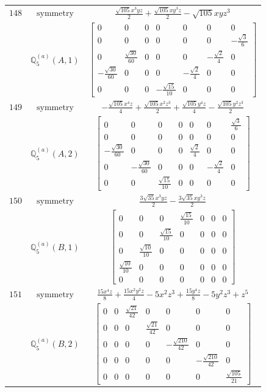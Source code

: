 \documentclass[fleqn,8pt,landscape]{jsarticle}
\begin{document}
\begin{longtable}{ccc}
$ 148 $ & $ \text{symmetry} $ & $ \frac{\sqrt{105} x^{3} y z}{2} + \frac{\sqrt{105} x y^{3} z}{2} - \sqrt{105} x y z^{3} $ \\
$  $ & $ \mathbb{Q}_{5}^{(a)}(A,1) $ & $ \begin{bmatrix} 0 & 0 & 0 & 0 & 0 & 0 & 0 \\ 0 & 0 & 0 & 0 & 0 & 0 & - \frac{\sqrt{3}}{6} \\ 0 & \frac{\sqrt{30}}{60} & 0 & 0 & 0 & - \frac{\sqrt{2}}{4} & 0 \\ - \frac{\sqrt{30}}{60} & 0 & 0 & 0 & - \frac{\sqrt{2}}{4} & 0 & 0 \\ 0 & 0 & 0 & - \frac{\sqrt{15}}{10} & 0 & 0 & 0 \end{bmatrix} $ \\ \hline
$ 149 $ & $ \text{symmetry} $ & $ - \frac{\sqrt{105} x^{4} z}{4} + \frac{\sqrt{105} x^{2} z^{3}}{2} + \frac{\sqrt{105} y^{4} z}{4} - \frac{\sqrt{105} y^{2} z^{3}}{2} $ \\
$  $ & $ \mathbb{Q}_{5}^{(a)}(A,2) $ & $ \begin{bmatrix} 0 & 0 & 0 & 0 & 0 & 0 & \frac{\sqrt{3}}{6} \\ 0 & 0 & 0 & 0 & 0 & 0 & 0 \\ - \frac{\sqrt{30}}{60} & 0 & 0 & 0 & \frac{\sqrt{2}}{4} & 0 & 0 \\ 0 & - \frac{\sqrt{30}}{60} & 0 & 0 & 0 & - \frac{\sqrt{2}}{4} & 0 \\ 0 & 0 & \frac{\sqrt{15}}{10} & 0 & 0 & 0 & 0 \end{bmatrix} $ \\ \hline
$ 150 $ & $ \text{symmetry} $ & $ \frac{3 \sqrt{35} x^{3} y z}{2} - \frac{3 \sqrt{35} x y^{3} z}{2} $ \\
$  $ & $ \mathbb{Q}_{5}^{(a)}(B,1) $ & $ \begin{bmatrix} 0 & 0 & 0 & \frac{\sqrt{15}}{10} & 0 & 0 & 0 \\ 0 & 0 & \frac{\sqrt{15}}{10} & 0 & 0 & 0 & 0 \\ 0 & \frac{\sqrt{10}}{10} & 0 & 0 & 0 & 0 & 0 \\ \frac{\sqrt{10}}{10} & 0 & 0 & 0 & 0 & 0 & 0 \\ 0 & 0 & 0 & 0 & 0 & 0 & 0 \end{bmatrix} $ \\ \hline
$ 151 $ & $ \text{symmetry} $ & $ \frac{15 x^{4} z}{8} + \frac{15 x^{2} y^{2} z}{4} - 5 x^{2} z^{3} + \frac{15 y^{4} z}{8} - 5 y^{2} z^{3} + z^{5} $ \\
$  $ & $ \mathbb{Q}_{5}^{(a)}(B,2) $ & $ \begin{bmatrix} 0 & 0 & \frac{\sqrt{21}}{42} & 0 & 0 & 0 & 0 \\ 0 & 0 & 0 & \frac{\sqrt{21}}{42} & 0 & 0 & 0 \\ 0 & 0 & 0 & 0 & - \frac{\sqrt{210}}{42} & 0 & 0 \\ 0 & 0 & 0 & 0 & 0 & - \frac{\sqrt{210}}{42} & 0 \\ 0 & 0 & 0 & 0 & 0 & 0 & \frac{\sqrt{105}}{21} \end{bmatrix} $ \\ \hline

\end{longtable}
\end{document}
